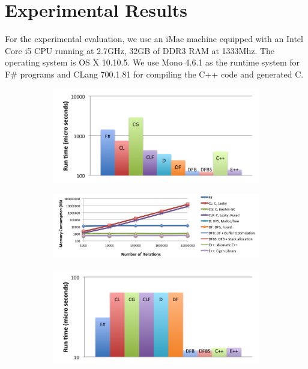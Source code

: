 \section{Experimental Results}
\label{sec:exp}
For the experimental evaluation, we use an iMac machine equipped with
an Intel Core i5 CPU running at 2.7GHz, 32GB of DDR3 RAM at
1333Mhz.
The operating system is OS X 10.10.5. We use Mono 4.6.1 as the runtime system for F\# programs and CLang 700.1.81 for compiling the C++ code and generated C.


\begin{figure}[t]
\begin{subfigure}[b]{.38\textwidth}
\includegraphics[width=\columnwidth]{results/micro_add3_runtime.png}
\label{fig:runtime_add3}
\end{subfigure}
\hfill
\begin{subfigure}[b]{.58\textwidth}
\includegraphics[width=\columnwidth]{results/micro_add3_mem.png}
\label{fig:mem_add3}
\end{subfigure}
\begin{subfigure}[b]{.38\textwidth}
\includegraphics[width=\columnwidth]{results/micro_cross_runtime.png}

\end{subfigure}
\end{figure}
